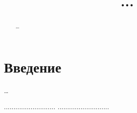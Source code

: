 \documentclass[
    aps,
    12pt,
    final,
    notitlepage,
    oneside,
    onecolumn,
    nobibnotes,
    nofootinbib,
    superscriptaddress,
    noshowpacs,
    centertags
    ]{revtex4}
\begin{document}

\title{...}


\author{ }

\author{ }


\begin{abstract}
    \ldots
\end{abstract}

\maketitle

\section{Введение}
    \ldots

\newpage
\begin{thebibliography}{99}
...........................
...........................
\end{thebibliography}
\end{document}
